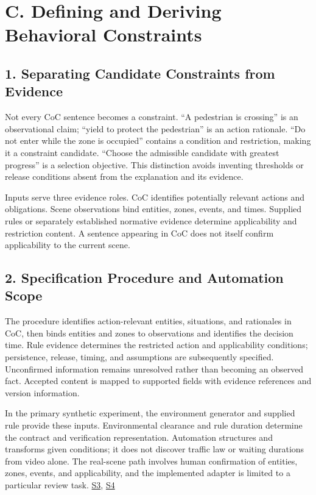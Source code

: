 \documentclass[11pt,a4paper]{article}
\begin{document}
\section*{C. Defining and Deriving Behavioral Constraints}

\subsection*{1. Separating Candidate Constraints from Evidence}

Not every CoC sentence becomes a constraint. “A pedestrian is crossing” is an observational claim; “yield to protect the pedestrian” is an action rationale. “Do not enter while the zone is occupied” contains a condition and restriction, making it a constraint candidate. “Choose the admissible candidate with greatest progress” is a selection objective. This distinction avoids inventing thresholds or release conditions absent from the explanation and its evidence.\par

Inputs serve three evidence roles. CoC identifies potentially relevant actions and obligations. Scene observations bind entities, zones, events, and times. Supplied rules or separately established normative evidence determine applicability and restriction content. A sentence appearing in CoC does not itself confirm applicability to the current scene.\par

\subsection*{2. Specification Procedure and Automation Scope}

The procedure identifies action-relevant entities, situations, and rationales in CoC, then binds entities and zones to observations and identifies the decision time. Rule evidence determines the restricted action and applicability conditions; persistence, release, timing, and assumptions are subsequently specified. Unconfirmed information remains unresolved rather than becoming an observed fact. Accepted content is mapped to supported fields with evidence references and version information.\par

In the primary synthetic experiment, the environment generator and supplied rule provide these inputs. Environmental clearance and rule duration determine the contract and verification representation. Automation structures and transforms given conditions; it does not discover traffic law or waiting durations from video alone. The real-scene path involves human confirmation of entities, zones, events, and applicability, and the implemented adapter is limited to a particular review task. \href{\detokenize{../../../../../../projects/04-guardsynth-coc/experiments/paper1_cnl_learning/temporal_training_data.py}}{S3}, \href{\detokenize{../../../../../../projects/04-guardsynth-coc/src/guard_synth/qualitative_scene_contract.py}}{S4}\par
\end{document}
